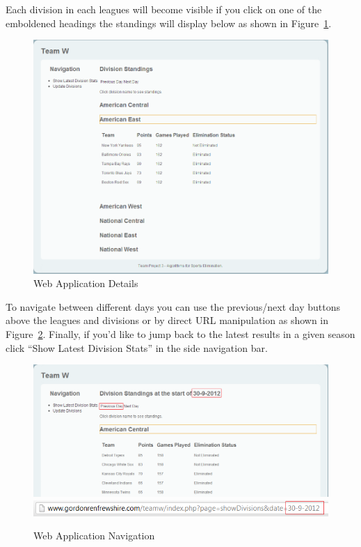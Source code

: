 Each division in each leagues will become visible if you click on one of
the emboldened headings the standings will display below as shown in
Figure~\ref{fig:WEBINFO}.

\begin{figure}
\includegraphics[width=\linewidth,keepaspectratio]{images/userManualWeb2.png}
\caption{Web Application Details}\label{fig:WEBINFO}
\end{figure}

To navigate between different days you can use the previous/next day buttons
above the leagues and divisions or by direct URL manipulation as shown
in Figure~\ref{fig:WEBNAV}. Finally, if you'd like to jump back to the
latest results in a given season click ``Show Latest Division Stats''
in the side navigation bar. 

\begin{figure}
\includegraphics[width=\linewidth,keepaspectratio]{images/userManualWeb3.png}
\includegraphics[width=\linewidth,keepaspectratio]{images/userManualWeb4.png}
\caption{Web Application Navigation}\label{fig:WEBNAV}
\end{figure}

